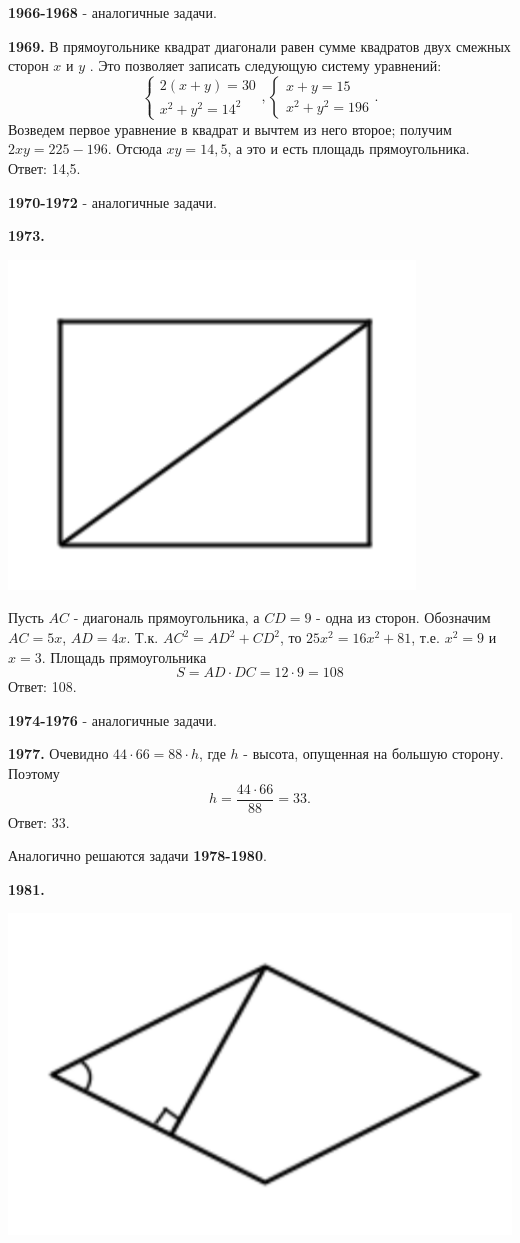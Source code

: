 \textbf{1966-1968} - аналогичные задачи.

\textbf{1969.} В прямоугольнике квадрат диагонали равен сумме квадратов двух смежных сторон $x$ и $y$ .  Это позволяет записать следующую систему уравнений:
\[
\begin{cases} 
	2(x+y)=30\\
	x^2+y^2=14^2
\end{cases},
\begin{cases}
	x+y=15\\
	x^2+y^2=196
\end{cases}.
\]
Возведем первое уравнение в квадрат и вычтем из него второе; получим $2xy=225-196$. Отсюда $xy=14,5$, а это и есть площадь прямоугольника. \newline \null \hspace*{\fill} Ответ: 14,5.

\textbf{1970-1972} - аналогичные задачи.

\clearpage 

\textbf{1973.}

{\centering \includegraphics[width=0.4\linewidth]{Geometry/Content/31.png}
	
}

Пусть $AC$ - диагональ прямоугольника, а $CD = 9$ - одна из сторон. Обозначим $AC = 5x$, $AD = 4x$. Т.к. $AC^2 = AD^2 +CD^2$, то
$25x^2 = 16x^2 +81$, т.е. $x^2=9$ и $x =3$. Площадь прямоугольника
\[
S =AD\cdot DC = 12\cdot 9 =108
\]
\null \hspace*{\fill} Ответ: 108.

\textbf{1974-1976} - аналогичные задачи.

\textbf{1977.} Очевидно $44\cdot 66 = 88\cdot h$, где $h$ - высота, опущенная на большую сторону. Поэтому
\[
h = \frac{44\cdot66}{88} = 33.
\]
\null \hspace*{\fill} Ответ: 33.

Аналогично решаются задачи \textbf{1978-1980}.

\textbf{1981.}

{\centering \includegraphics[width=0.45\linewidth]{Geometry/Content/32.png}
	
}

